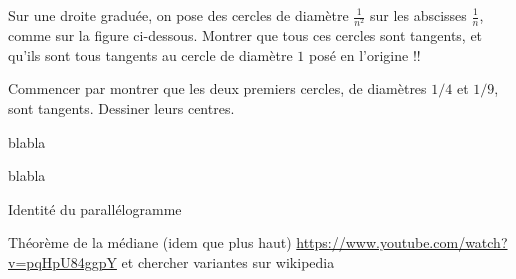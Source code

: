 \begin{exo}
Sur une droite graduée, on \og pose\fg{} des cercles de diamètre $\frac{1}{n^2}$ sur les abscisses $\frac{1}{n}$, comme sur la figure ci-dessous. Montrer que tous ces cercles sont tangents, et qu'ils sont tous tangents au cercle de diamètre $1$ posé en l'origine !!
\begin{center}
\end{center}
\begin{hint}
Commencer par montrer que les deux premiers cercles, de diamètres $1/4$ et $1/9$, sont tangents. Dessiner leurs centres.
\end{hint}
\end{exo}

\begin{exo}
blabla
\begin{center}
\begin{tikzpicture}
\end{tikzpicture}
\end{center}
\end{exo}


\begin{exo}
blabla
\begin{center}
\begin{tikzpicture}
\end{tikzpicture}
\end{center}
\end{exo}


\begin{exo}
Identité du parallélogramme
\begin{center}
\begin{tikzpicture}
\end{tikzpicture}
\end{center}
\end{exo}

\begin{exo}
Théorème de la médiane (idem que plus haut)
\url{https://www.youtube.com/watch?v=pqHpU84ggpY}
et chercher variantes sur wikipedia
\begin{center}
\begin{tikzpicture}
\end{tikzpicture}
\end{center}
\end{exo}

